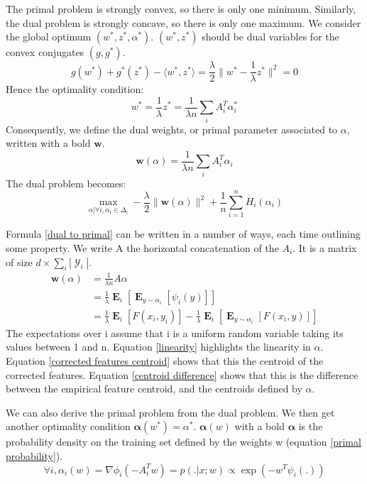 \documentclass{article}
\DeclareMathOperator{\1}{\mathbb{1}}
\DeclareMathOperator{\E}{\mathbf{E}}
\DeclareMathOperator{\Y}{\mathcal{Y}}
\begin{document}
The primal problem is strongly convex, so there is only one minimum.
Similarly, the dual problem is strongly concave, so there is only one maximum.
We consider the global optimum $(w^*,z^*,\alpha^*)$.
$(w^*,z^*)$ should be dual variables for the convex conjugates $(g, g^*)$.
\begin{equation*}
	g(w^*) + g^*(z^*) - \langle w^*, z^* \rangle = \frac{\lambda}{2} \| w^* - \frac{1}{\lambda} z^* \|^2 = 0
\end{equation*}
Hence the optimality condition:
\begin{equation*}
	w^* = 	\frac{1}{\lambda} z^* =  \frac{1}{\lambda n} \sum_i A_i^T \alpha_i^*
\end{equation*}
Consequently, we define the dual weights, or primal parameter associated to $\alpha$, written with a bold $\bm w$.
\begin{equation}
	\label{dual to primal}
	\bm w(\alpha) =   \frac{1}{\lambda n} \sum_i A_i^T \alpha_i
\end{equation}
The dual problem becomes:
\begin{equation}
	\label{dual problem}
	\max_{\alpha | \forall i, \alpha_i \in \Delta_i} -\frac{\lambda}{2} \| \bm w(\alpha) \|^2 + \frac{1}{n} \sum_{i=1}^n H_i(\alpha_i)
\end{equation}

Formula \ref{dual to primal} can be written in a number of ways, each time outlining some property.
We write A the horizontal concatenation of the $A_i$.
It is a matrix of size $d \times \sum_i |\Y_i|$.
\begin{align}
	\bm w(\alpha) & = \frac{1}{\lambda n} A \alpha \label{linearity} \\
	 & = \frac{1}{\lambda} \E_{i} [ \E_{y \sim \alpha_i} [\psi_i(y)]] \label{corrected features centroid} \\
	 & =   \frac{1}{\lambda} \E_{i} [F(x_i, y_i)] - \frac{1}{\lambda} \E_{i} [ \E_{y \sim \alpha_i} [F(x_i, y)]]
	 \label{centroid difference}
\end{align}
The expectations over i assume that i is a uniform random variable taking its values between 1 and n. 
Equation \ref{linearity} highlights the linearity in $\alpha$. Equation \ref{corrected features centroid} shows that this the centroid of the corrected features. Equation \ref{centroid difference} shows that this is the difference between the empirical feature centroid, and the centroids defined by $\alpha$.

We can also derive the primal problem from the dual problem.
We then get another optimality condition $\bm \alpha(w^*) = \alpha^*$.
$\bm \alpha(w)$ with a bold $\bm \alpha$ is the probability density on the training set defined by the weights w (equation \ref{primal probability}).
\begin{equation}
	\label{primal to dual}
	\forall i, \alpha_i(w) = \nabla\phi_i(-A_i^Tw) = p(.|x; w) \propto \exp(-w^T \psi_i(.))
\end{equation}
\end{document}
